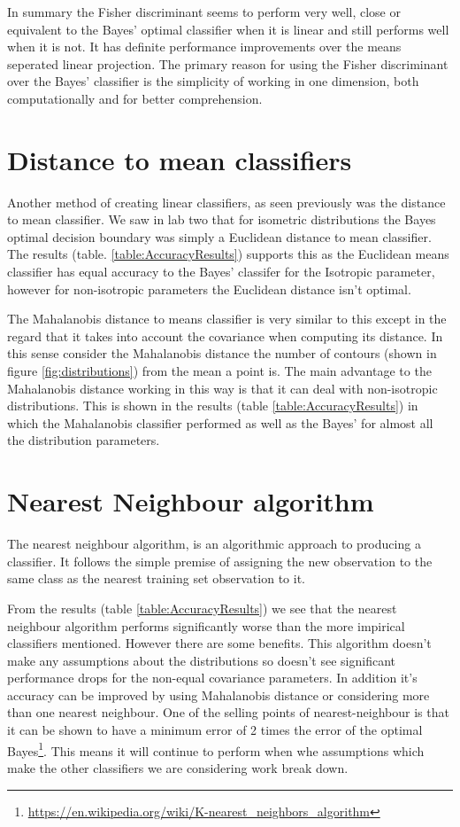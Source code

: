 \documentclass[a4paper,11pt, twocolumn]{article}
\begin{document}
In summary the Fisher discriminant seems to perform very well, close or equivalent to the Bayes' optimal classifier when it is linear and still performs well when it is not. It has definite performance improvements over the means seperated linear projection. The primary reason for using the Fisher discriminant over the Bayes' classifier is the simplicity of working in one dimension, both computationally and for better comprehension. 

\section{Distance to mean classifiers}
Another method of creating linear classifiers, as seen previously was the distance to mean classifier. We saw in lab two that for isometric distributions the Bayes optimal decision boundary was simply a Euclidean distance to mean classifier. The results (table. \ref{table:AccuracyResults}) supports this as the Euclidean means classifier has equal accuracy to the Bayes' classifer for the Isotropic parameter, however for non-isotropic parameters the Euclidean distance isn't optimal. 

The Mahalanobis distance to means classifier is very similar to this except in the regard that it takes into account the covariance when computing its distance. In this sense consider the Mahalanobis distance the number of contours (shown in figure \ref{fig:distributions}) from the mean a point is. The main advantage to the Mahalanobis distance working in this way is that it can deal with non-isotropic distributions. This is shown in the results (table \ref{table:AccuracyResults}) in which the Mahalanobis classifier performed as well as the Bayes' for almost all the distribution parameters.

\section{Nearest Neighbour algorithm}

The nearest neighbour algorithm, is an algorithmic approach to producing a classifier. It follows the simple premise of assigning the new observation to the same class as the nearest training set observation to it. 

From the results (table \ref{table:AccuracyResults}) we see that the nearest neighbour algorithm performs significantly worse than the more impirical classifiers mentioned. However there are some benefits. This algorithm doesn't make any assumptions about the distributions so doesn't see significant performance drops for the non-equal covariance parameters. In addition it's accuracy can be improved by using Mahalanobis distance or considering more than one nearest neighbour. One of the selling points of nearest-neighbour is that it can be shown to have a minimum error of 2 times the error of the optimal Bayes\footnote{\url{https://en.wikipedia.org/wiki/K-nearest_neighbors_algorithm}}. This means it will continue to perform when whe assumptions which make the other classifiers we are considering work break down.
\end{document}
